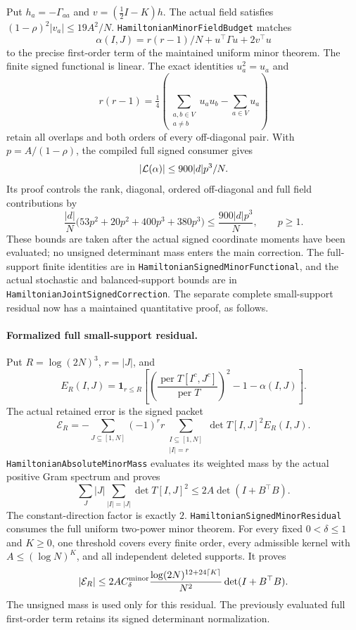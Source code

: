 Put \(h_a=-\Gamma_{aa}\) and \(v=(\tfrac12 I-K)h\).
The actual field satisfies
\((1-\rho)^2|v_a|\leq19A^2/N\).
\texttt{HamiltonianMinorFieldBudget} matches
\[
 \alpha(I,J)=r(r-1)/N+u^\top\Gamma u+2v^\top u
\]
to the precise first-order term of the maintained uniform minor
theorem. The finite signed functional is linear. The exact identities
\(u_a^2=u_a\) and
\[
 r(r-1)=\tfrac14\left(\sum_{\substack{a,b\in V\\a\ne b}}u_au_b
                                  -\sum_{a\in V}u_a\right)
\]
retain all overlaps and both orders of every off-diagonal pair.
With \(p=A/(1-\rho)\), the compiled full signed consumer gives
\[
 \left|{\cal L}(\alpha)\right|\leq900|d|p^3/N .
\]
Its proof controls the rank, diagonal, ordered off-diagonal and
full field contributions by
\[
 \frac{|d|}{N}
       \bigl(53p^2+20p^2+400p^3+380p^3\bigr)
             \leq\frac{900|d|p^3}{N},\qquad p\geq1.
\]
These bounds are taken after the actual signed coordinate
moments have been evaluated; no unsigned determinant mass enters
the main correction. The full-support finite identities are in
\texttt{HamiltonianSignedMinorFunctional}, and the actual stochastic
and balanced-support bounds are in
\texttt{HamiltonianJointSignedCorrection}. The separate complete
small-support residual now has a maintained quantitative proof,
as follows.

\paragraph{Formalized full small-support residual.}
Put \(R=\log(2N)^3\), \(r=|J|\), and
\[
 E_R(I,J)=\mathbf1_{r\leq R}
 \left[
  \left(\frac{\operatorname{per}T[I^c,J^c]}{\operatorname{per}T}\right)^2
                       -1-\alpha(I,J)\right].
\]
The actual retained error is the signed packet
\[
 \mathcal E_R=-\sum_{J\subseteq[1,N]}(-1)^r r
       \sum_{\substack{I\subseteq[1,N]\\|I|=r}}
                   \det T[I,J]^2 E_R(I,J).
\]
\texttt{HamiltonianAbsoluteMinorMass} evaluates its weighted mass
by the actual positive Gram spectrum and proves
\[
 \sum_J |J|\sum_{|I|=|J|}\det T[I,J]^2
                         \leq2A\det(I+B^\top B).
\]
The constant-direction factor is exactly \(2\).
\texttt{HamiltonianSignedMinorResidual} consumes the full uniform
two-power minor theorem. For every fixed \(0<\delta\leq1\)
and \(K\geq0\), one threshold covers every finite order,
every admissible kernel with \(A\leq(\log N)^K\), and all
independent deleted supports. It proves
\[
 |\mathcal E_R|\leq
 2A C_\delta^{\rm minor}
       \frac{\log(2N)^{12+24\lceil K\rceil}}{N^2}
                                  \det(I+B^\top B).
\]
The unsigned mass is used only for this residual. The previously
evaluated full first-order term retains its signed determinant
normalization.

